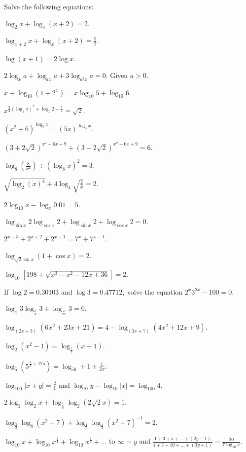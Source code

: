\noindent Solve the following equations:

\item $\log_2x + \log_4(x + 2) = 2$.
\item $\log_{x + 2}x + \log_x(x + 2) = \frac{5}{2}$.
\item $\log(x + 1) = 2\log x$.
\item $2\log_xa + \log_{ax}a + 3\log_{a^2x}a = 0.$ Given $a > 0$.
\item $x + \log_{10}(1 + 2^x) = x\log_{10}5 + \log_{10}6$.
\item $x^{\frac{3}{4}(\log_2x)^2 + \log_x2 - \frac{5}{4}} = \sqrt{2}$.
\item $(x^2 + 6)^{\log_3x} = (5x)^{\log_3x}$.
\item $(3 + 2\sqrt{2})^{x^2 - 6x + 9} + (3 - 2\sqrt{2})^{x^2 - 6x + 9} = 6$.
\item $\log_8\left(\frac{8}{x^2}\right)\div(\log_8x)^2 = 3$.
\item $\sqrt{\log_2(x)^4} + 4\log_4\sqrt{\frac{2}{x}} = 2$.
\item $2\log_{10}x - \log_x0.01 = 5$.
\item $\log_{\sin x}2\log_{\cos x}2 + \log_{\sin x}2 + \log_{\cos x}2 = 0$.
\item $2^{x + 3} + 2^{x+2} + 2^{x + 1} = 7^x + 7^{x - 1}$.
\item $\log_{\sqrt{2}\sin x}(1 + \cos x) = 2$.
\item $\log_{10}[198 + \sqrt{x^3 - x^2 - 12x + 36}] = 2$.
\item If $\log 2 = 0.30103$ and $\log 3 = 0.47712,$ solve the equation $2^x3^{2x} - 100 = 0$.
\item $\log_x3\log_{\frac{x}{3}}3 + \log_{\frac{x}{81}}3 = 0$.
\item $\log_{(2x + 3)}(6x^2 + 23x + 21) = 4 - \log_{(3x + 7)}(4x^2 + 12x + 9)$.
\item $\log_2(x^2 - 1) = \log_{\frac{1}{2}}(x - 1)$.
\item $\log_5\left(5^{\frac{1}{x} + 125}\right) = \log_56 + 1 + \frac{1}{2x}$.
\item $\log_{100}|x + y| = \frac{2}{1}$ and $\log_{10}y - \log_{10}|x| = \log_{100}4$.
\item $2\log_2\log_2x + \log_{\frac{1}{2}}\log_2(2\sqrt{2}x) = 1$.
\item $\log_{\frac{3}{4}}\log_8(x^2 + 7) + \log_{\frac{1}{2}}\log_{\frac{1}{4}}(x^2 + 7)^{-1} = 2$.
\item $\log_{10}x + \log_{10}x^{\frac{2}{1}} + \log_{10}x^{\frac{1}{4}} + \ldots$ to $\infty = y$ and $\frac{1 + 3 + 5 + \ldots +
  (2y - 1)}{4 + 7 + 10 + \ldots + (3y + 1)} = \frac{20}{7\log_{10}x}$.
